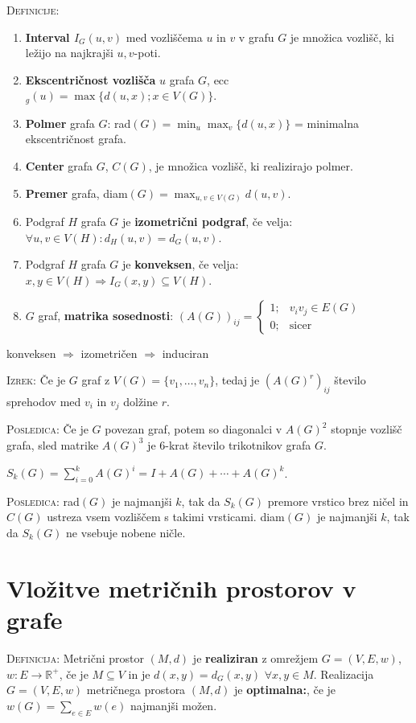 \documentclass[8pt,a4paper]{amsart}
\theoremstyle{definition} %
\theoremstyle{plain} %
\newcommand{\R}{\mathbb R}
\begin{document}
\textsc{Definicije:}
\begin{enumerate}
\item \textbf{Interval $I_G(u,v)$} med vozliščema $u$ in $v$ v grafu $G$ je množica vozlišč, ki ležijo na najkrajši $u,v$-poti.
\item \textbf{Ekscentričnost vozlišča} $u$ grafa $G$, ecc$_g(u) = \max{\{d(u,x);x \in V(G) \}}$.
\item \textbf{Polmer} grafa $G$: rad$(G) = \min_u{\max_v{\{ d(u,x)\}}}$ = minimalna ekscentričnost grafa.
\item \textbf{Center} grafa $G$, $C(G)$, je množica vozlišč, ki realizirajo polmer.
\item \textbf{Premer} grafa, diam$(G) = \max_{u,v \in V(G)}d(u,v)$.
\item Podgraf $H$ grafa $G$ je \textbf{izometrični podgraf}, če velja: $\forall u,v \in V(H): d_H(u,v) = d_G(u,v)$.
\item Podgraf $H$ grafa $G$ je \textbf{konveksen}, če velja: $x,y \in V(H) \Longrightarrow I_G(x,y) \subseteq V(H)$.
\item $G$ graf, \textbf{matrika sosednosti}: $(A(G))_{ij} = \begin{cases} 1;&v_iv_j \in E(G) \\ 0;& \text{sicer}\end{cases}$
\end{enumerate}

konveksen $\Longrightarrow$ izometričen $\Longrightarrow$ induciran

\textsc{Izrek:} Če je $G$ graf z $V(G) = \{ v_1,\ldots ,v_n \}$, tedaj je
$(A(G)^r)_{ij}$ število sprehodov med $v_i$ in $v_j$ dolžine $r$.

\textsc{Posledica:} Če je $G$ povezan graf, potem so diagonalci v $A(G)^2$
stopnje vozlišč grafa, sled matrike $A(G)^3$ je 6-krat število trikotnikov grafa
$G$.

$S_k(G) = \sum_{i=0}^kA(G)^i = I + A(G) + \cdots + A(G)^k$.

\textsc{Posledica:} rad$(G) $ je najmanjši $k$, tak da $S_k(G)$ premore vrstico
brez ničel in $C(G)$ ustreza vsem vozliščem s takimi vrsticami. diam$(G)$ je
najmanjši $k$, tak da $S_k(G)$ ne vsebuje nobene ničle.

\section{Vložitve metričnih prostorov v grafe}

\textsc{Definicija:} Metrični prostor $(M,d)$ je \textbf{realiziran} z omrežjem
$G = (V,E,w)$, $w:E\longrightarrow \R^+$, če je $M \subseteq V$ in je $d(x,y) =
d_G(x,y)$ $\forall x,y \in M$. Realizacija $G=(V,E,w)$ metričnega prostora
$(M,d)$ je \textbf{optimalna:}, če je $w(G) = \sum_{e \in E} w(e)$ najmanjši
možen.
\end{document}
